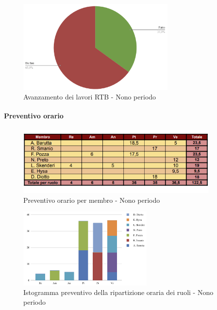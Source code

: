 \begin{figure}[H]
    \centering
    \begin{minipage}[b]{0.70\textwidth}
        \centering
        \includegraphics[width=0.7\textwidth]{../Images/torta9.png}
        \caption{Avanzamento dei lavori RTB - Nono periodo}
        \label{fig:Avanzamento_RTB_9}
    \end{minipage}
\end{figure}

\paragraph{Preventivo orario}

\begin{figure}[H] 
    \centering
    \includegraphics[width=0.9\textwidth]{../Images/tabPrev9.png}
    \caption{Preventivo orario per membro - Nono periodo}
    \label{fig:Preventivo_orario_9}
\end{figure}

\begin{figure}[H]
    \centering
    \includegraphics[width=0.6\textwidth]{../Images/graficoConsPrev9.png}
    \caption{Istogramma preventivo della ripartizione oraria dei ruoli - Nono periodo}
    \label{fig:Preventivo_ripartizione_oraria_9}
\end{figure}

